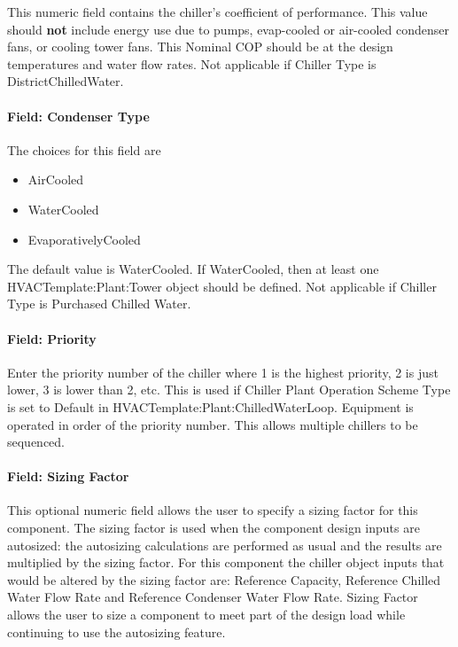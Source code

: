 This numeric field contains the chiller's coefficient of performance. This value should \textbf{not} include energy use due to pumps, evap-cooled or air-cooled condenser fans, or cooling tower fans. This Nominal COP should be at the design temperatures and water flow rates. Not applicable if Chiller Type is DistrictChilledWater.

\paragraph{Field: Condenser Type}\label{field-condenser-type-1-000}

The choices for this field are

\begin{itemize}
\item
  AirCooled
\item
  WaterCooled
\item
  EvaporativelyCooled
\end{itemize}

The default value is WaterCooled. If WaterCooled, then at least one HVACTemplate:Plant:Tower object should be defined. Not applicable if Chiller Type is Purchased Chilled Water.

\paragraph{Field: Priority}\label{field-priority}

Enter the priority number of the chiller where 1 is the highest priority, 2 is just lower, 3 is lower than 2, etc. This is used if Chiller Plant Operation Scheme Type is set to Default in HVACTemplate:Plant:ChilledWaterLoop. Equipment is operated in order of the priority number. This allows multiple chillers to be sequenced.

\paragraph{Field: Sizing Factor}\label{field-sizing-factor-000}

This optional numeric field allows the user to specify a sizing factor for this component. The sizing factor is used when the component design inputs are autosized: the autosizing calculations are performed as usual and the results are multiplied by the sizing factor. For this component the chiller object inputs that would be altered by the sizing factor are: Reference Capacity, Reference Chilled Water Flow Rate and Reference Condenser Water Flow Rate. Sizing Factor allows the user to size a component to meet part of the design load while continuing to use the autosizing feature.

